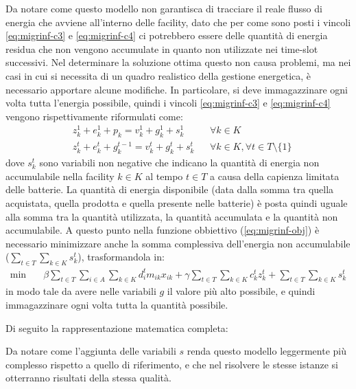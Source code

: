 Da notare come questo modello non garantisca di tracciare il reale flusso di energia che avviene all'interno delle facility, dato che per come sono posti i vincoli \ref{eq:migrinf-c3} e \ref{eq:migrinf-c4} ci potrebbero essere delle quantità di energia residua che non vengono accumulate in quanto non utilizzate nei time-slot successivi. Nel determinare la soluzione ottima questo non causa problemi, ma nei casi in cui si necessita di un quadro realistico della gestione energetica, è necessario apportare alcune modifiche. In particolare, si deve immagazzinare ogni volta tutta l'energia possibile, quindi i vincoli \ref{eq:migrinf-c3} e \ref{eq:migrinf-c4} vengono rispettivamente riformulati come:
\begin{align}
    \label{eq:statico-c3var}
    & z_k^1 + e_k^1 + p_k = v_k^1 + g_k^1 + s_k^1       &   & \forall k \in K                                  \\
    \label{eq:statico-c4var}
    & z_k^t + e_k^t + g_k^{t-1} = v_k^t + g_k^t + s_k^t &   & \forall k \in K, \forall t \in T \setminus \{1\}
\end{align}
\noindent
dove $s^t_k$ sono variabili non negative che indicano la quantità di energia non accumulabile nella facility $k \in K$ al tempo $t \in T$ a causa della capienza limitata delle batterie. La quantità di energia disponibile (data dalla somma tra quella acquistata, quella prodotta e quella presente nelle batterie) è posta quindi uguale alla somma tra la quantità utilizzata, la quantità accumulata e la quantità non accumulabile. A questo punto nella funzione obbiettivo (\ref{eq:migrinf-obj}) è necessario minimizzare anche la somma complessiva dell'energia non accumulabile ($\sum_{t \in T}\sum_{k \in K} s^t_k$), trasformandola in:
\begin{align}
    \label{eq:migrinf-objvar}
    \min\quad       & \beta \sum_{t \in T} \sum_{i \in A} \sum_{k \in K}{d^t_i m_{ik} x_{ik}} + \gamma \sum_{t \in T} \sum_{k \in K}{c_k^t z_k^t} + \sum_{t \in T} \sum_{k \in K}{s_k^t}
\end{align}
\noindent
in modo tale da avere nelle variabili $g$ il valore più alto possibile, e quindi immagazzinare ogni volta tutta la quantità possibile.

Di seguito la rappresentazione matematica completa:



Da notare come l'aggiunta delle variabili $s$ renda questo modello leggermente più complesso rispetto a quello di riferimento, e che nel risolvere le stesse istanze si otterranno risultati della stessa qualità.


